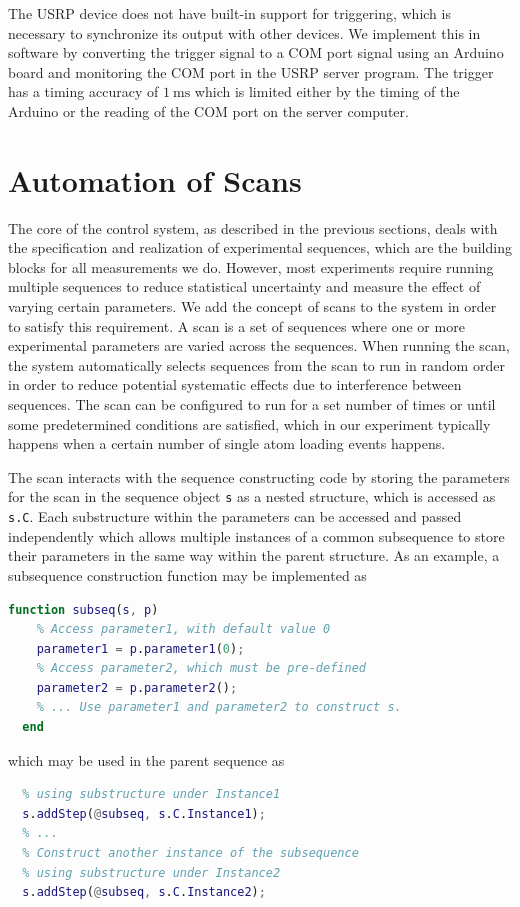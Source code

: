 The USRP device does not have built-in support for triggering,
which is necessary to synchronize its output with other devices.
We implement this in software by converting the trigger signal to a COM port signal
using an Arduino board and monitoring the COM port in the USRP server program.
The trigger has a timing accuracy of $1~\mathrm{ms}$
which is limited either by the timing of the Arduino or
the reading of the COM port on the server computer.

\section{Automation of Scans}
\label{ch:computer-control:scan}

The core of the control system, as described in the previous sections,
deals with the specification and realization of experimental sequences,
which are the building blocks for all measurements we do.
However, most experiments require running multiple sequences
to reduce statistical uncertainty and measure the effect of varying certain parameters.
We add the concept of scans to the system in order to satisfy this requirement.
A scan is a set of sequences where one or more experimental parameters are varied
across the sequences.
When running the scan, the system automatically selects sequences
from the scan to run in random order in order to reduce potential systematic effects
due to interference between sequences.
The scan can be configured to run for a set number of times
or until some predetermined conditions are satisfied,
which in our experiment typically happens
when a certain number of single atom loading events happens.

The scan interacts with the sequence constructing code
by storing the parameters for the scan in the sequence object \verb`s` as a nested structure,
which is accessed as \verb`s.C`.
Each substructure within the parameters can be accessed and passed independently
which allows multiple instances of a common subsequence
to store their parameters in the same way within the parent structure.
As an example, a subsequence construction function may be implemented as
\begin{lstlisting}[language=Matlab]
  function subseq(s, p)
    % Access parameter1, with default value 0
    parameter1 = p.parameter1(0);
    % Access parameter2, which must be pre-defined
    parameter2 = p.parameter2();
    % ... Use parameter1 and parameter2 to construct s.
  end
\end{lstlisting}
which may be used in the parent sequence as
\begin{lstlisting}[language=Matlab]
  % Construct one instance of the subsequence
  % using substructure under Instance1
  s.addStep(@subseq, s.C.Instance1);
  % ...
  % Construct another instance of the subsequence
  % using substructure under Instance2
  s.addStep(@subseq, s.C.Instance2);
\end{lstlisting}

